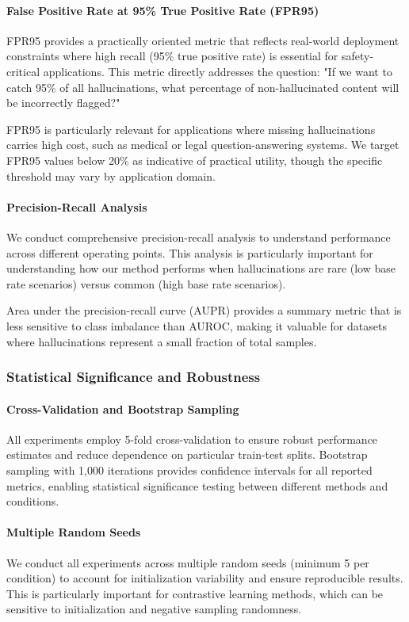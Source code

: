 \paragraph{False Positive Rate at 95\% True Positive Rate (FPR95)}
FPR95 provides a practically oriented metric that reflects real-world deployment constraints where high recall (95\% true positive rate) is essential for safety-critical applications. This metric directly addresses the question: "If we want to catch 95\% of all hallucinations, what percentage of non-hallucinated content will be incorrectly flagged?"

FPR95 is particularly relevant for applications where missing hallucinations carries high cost, such as medical or legal question-answering systems. We target FPR95 values below 20\% as indicative of practical utility, though the specific threshold may vary by application domain.

\paragraph{Precision-Recall Analysis}
We conduct comprehensive precision-recall analysis to understand performance across different operating points. This analysis is particularly important for understanding how our method performs when hallucinations are rare (low base rate scenarios) versus common (high base rate scenarios).

Area under the precision-recall curve (AUPR) provides a summary metric that is less sensitive to class imbalance than AUROC, making it valuable for datasets where hallucinations represent a small fraction of total samples.

\subsubsection{Statistical Significance and Robustness}

\paragraph{Cross-Validation and Bootstrap Sampling}
All experiments employ 5-fold cross-validation to ensure robust performance estimates and reduce dependence on particular train-test splits. Bootstrap sampling with 1,000 iterations provides confidence intervals for all reported metrics, enabling statistical significance testing between different methods and conditions.

\paragraph{Multiple Random Seeds}
We conduct all experiments across multiple random seeds (minimum 5 per condition) to account for initialization variability and ensure reproducible results. This is particularly important for contrastive learning methods, which can be sensitive to initialization and negative sampling randomness.

